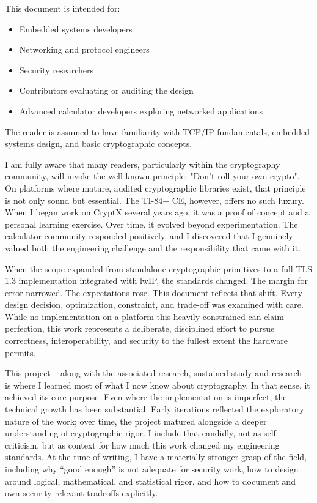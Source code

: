 \documentclass[titlepage]{report}
\begin{document}
	This document is intended for:
	\begin{itemize}
	\item Embedded systems developers
	\item Networking and protocol engineers
	\item Security researchers
	\item Contributors evaluating or auditing the design
	\item Advanced calculator developers exploring networked applications
	\end{itemize}
	
	The reader is assumed to have familiarity with TCP/IP fundamentals, embedded systems design, and basic cryptographic concepts.
	
	I am fully aware that many readers, particularly within the cryptography community, will invoke the well-known principle: "Don't roll your own crypto". On platforms where mature, audited cryptographic libraries exist, that principle is not only sound but essential. The TI-84+ CE, however, offers no such luxury. When I began work on CryptX several years ago, it was a proof of concept and a personal learning exercise. Over time, it evolved beyond experimentation. The calculator community responded positively, and I discovered that I genuinely valued both the engineering challenge and the responsibility that came with it.
	
	When the scope expanded from standalone cryptographic primitives to a full TLS 1.3 implementation integrated with lwIP, the standards changed. The margin for error narrowed. The expectations rose. This document reflects that shift. Every design decision, optimization, constraint, and trade-off was examined with care. While no implementation on a platform this heavily constrained can claim perfection, this work represents a deliberate, disciplined effort to pursue correctness, interoperability, and security to the fullest extent the hardware permits.
	
	This project -- along with the associated research, sustained study and research -- is where I learned most of what I now know about cryptography. In that sense, it achieved its core purpose. Even where the implementation is imperfect, the technical growth has been substantial. Early iterations reflected the exploratory nature of the work; over time, the project matured alongside a deeper understanding of cryptographic rigor. I include that candidly, not as self-criticism, but as context for how much this work changed my engineering standards. At the time of writing, I have a materially stronger grasp of the field, including why “good enough” is not adequate for security work, how to design around logical, mathematical, and statistical rigor, and how to document and own security-relevant tradeoffs explicitly.
	
\end{document}
